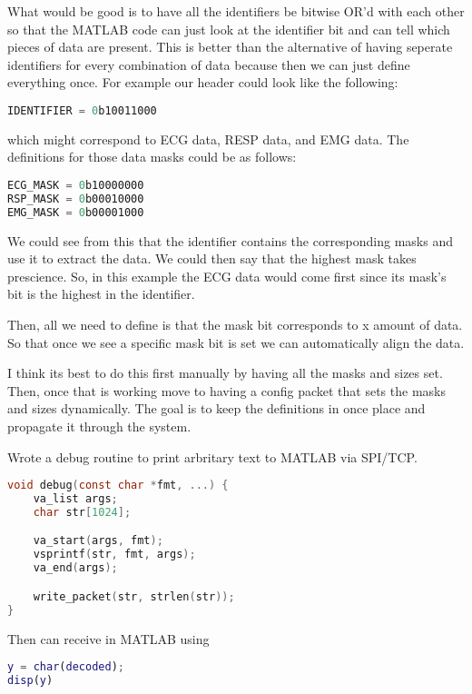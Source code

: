 What would be good is to have all the identifiers be bitwise OR'd
with each other so that the MATLAB code can just look at the identifier
bit and can tell which pieces of data are present.
This is better than the alternative of having seperate identifiers for
every combination of data because then we can just define everything once.
For example our header could look like the following:

\begin{lstlisting}[language=C]
IDENTIFIER = 0b10011000
\end{lstlisting}

which might correspond to ECG data, RESP data, and EMG data.
The definitions for those data masks could be as follows:

\begin{lstlisting}[language=C]
ECG_MASK = 0b10000000
RSP_MASK = 0b00010000
EMG_MASK = 0b00001000
\end{lstlisting}

We could see from this that the identifier contains the corresponding
masks and use it to extract the data.
We could then say that the highest mask takes prescience.
So, in this example the ECG data would come first since its mask's bit
is the highest in the identifier.

Then, all we need to define is that the mask bit corresponds to x amount
of data. So that once we see a specific mask bit is set we can
automatically align the data.

I think its best to do this first manually by having all the masks
and sizes set. Then, once that is working move to having a config packet
that sets the masks and sizes dynamically.
The goal is to keep the definitions in once place and propagate it
through the system.

Wrote a debug routine to print arbritary text to MATLAB via SPI/TCP.

\begin{lstlisting}[language=C]
void debug(const char *fmt, ...) {
    va_list args;
    char str[1024];

    va_start(args, fmt);
    vsprintf(str, fmt, args);
    va_end(args);

    write_packet(str, strlen(str));
}
\end{lstlisting}

Then can receive in MATLAB using

\begin{lstlisting}[language=MATLAB]
y = char(decoded);
disp(y)
\end{lstlisting}

